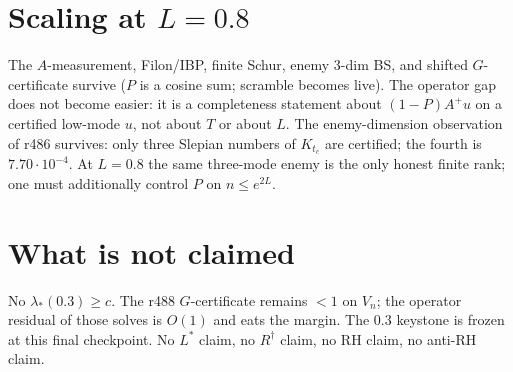 \documentclass[11pt]{article}
\theoremstyle{remark}
\begin{document}
\section{Scaling at $L=0.8$}

The $A$-measurement, Filon/IBP, finite Schur,
enemy $3$-dim BS, and shifted $G$-certificate
survive ($P$ is a cosine sum; scramble
becomes live).
The operator gap does not become easier:
it is a completeness statement about
$(1-P)A^+u$ on a certified low-mode $u$,
not about $T$ or about $L$.
The enemy-dimension observation of r486
survives: only three Slepian numbers of
$K_{t_c}$ are certified; the fourth is
$7.70\cdot10^{-4}$.
At $L=0.8$ the same three-mode enemy
is the only honest finite rank;
one must additionally control $P$ on
$n\le e^{2L}$.

\section{What is not claimed}

No $\lambda_*(0.3)\ge c$.
The r488 $G$-certificate remains
$<1$ on $V_n$;
the operator residual of those solves
is $O(1)$ and eats the margin.
The $0.3$ keystone is frozen at this
final checkpoint.
No $L^*$ claim, no $R^\dagger$ claim,
no RH claim, no anti-RH claim.
\end{document}
